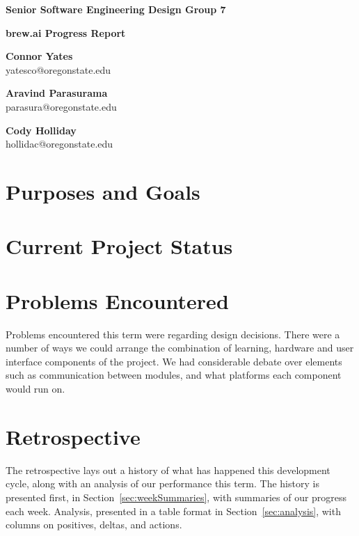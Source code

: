 \documentclass[draftclsnofoot,onecolumn,letterpaper,10pt]{IEEEtran}
\begin{document}
\begin{center}
	{\huge\textbf{Senior Software Engineering Design Group 7}}
	\vspace{1cm}

	{\Huge\textbf{brew.ai Progress Report}}

	\vspace{2cm}
	\textbf{Connor Yates}\\yatesco@oregonstate.edu

	\textbf{Aravind Parasurama}\\parasura@oregonstate.edu

	\textbf{Cody Holliday}\\hollidac@oregonstate.edu
\end{center}

\begin{abstract}

\end{abstract}

\newpage
\tableofcontents
\newpage

\section{Purposes and Goals}%

\section{Current Project Status}%

\section{Problems Encountered}%
Problems encountered this term were regarding design decisions.
There were a number of ways we could arrange the combination of learning, hardware and user interface components of the project.
We had considerable debate over elements such as communication between modules, and what platforms each component would run on.

\section{Retrospective}
The retrospective lays out a history of what has happened this development cycle, along with an analysis of our performance this term.
The history is presented first, in Section~\ref{sec:weekSummaries}, with summaries of our progress each week.
Analysis, presented in a table format in Section~\ref{sec:analysis}, with columns on positives, deltas, and actions.
\end{document}
